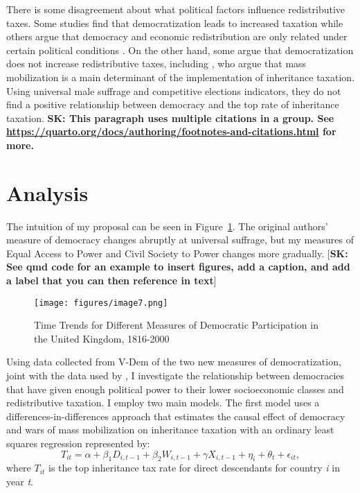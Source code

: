 \documentclass[12pt, ]{article}
\begin{document}
There is some disagreement about what political factors influence
redistributive taxes. Some studies find that democratization leads to
increased taxation while others argue that democracy and economic
redistribution are only related under certain political conditions
\citep{acemoglu2015democracy, albertus2014gaming}. On the other hand,
some argue that democratization does not increase redistributive taxes,
including \citet{scheve2012}, who argue that mass mobilization is a main
determinant of the implementation of inheritance taxation. Using
universal male suffrage and competitive elections indicators, they do
not find a positive relationship between democracy and the top rate of
inheritance taxation. \textbf{SK: This paragraph uses multiple citations
in a group. See
\url{https://quarto.org/docs/authoring/footnotes-and-citations.html} for
more.}

\hypertarget{analysis}{%
\section{Analysis}\label{analysis}}

The intuition of my proposal can be seen in Figure~\ref{fig-example}.
The original authors' measure of democracy changes abruptly at universal
suffrage, but my measures of Equal Access to Power and Civil Society to
Power changes more gradually. {[}\textbf{SK: See qmd code for an example
to insert figures, add a caption, and add a label that you can then
reference in text}{]}

\begin{figure}[tbp]

{\centering \texttt{[image: figures/image7.png]}

}

\caption{\label{fig-example}Time Trends for Different Measures of
Democratic Participation in the United Kingdom, 1816-2000}

\end{figure}

Using data collected from V-Dem of the two new measures of
democratization, joint with the data used by \citep{scheve2012}, I
investigate the relationship between democracies that have given enough
political power to their lower socioeconomic classes and redistributive
taxation. I employ two main models. The first model uses a
differences-in-differences approach that estimates the causal effect of
democracy and wars of mass mobilization on inheritance taxation with an
ordinary least squares regression represented by:
\[T_{it} = \alpha + \beta_{1}D_{i,t - 1} + \beta_{2}W_{i,t - 1} + \gamma X_{i,t - 1} + \eta_{i} + \theta_{t} + \epsilon_{it},\]
where \(T_{it}\) is the top inheritance tax rate for direct descendants
for country \emph{i} in year \emph{t}.
\end{document}
